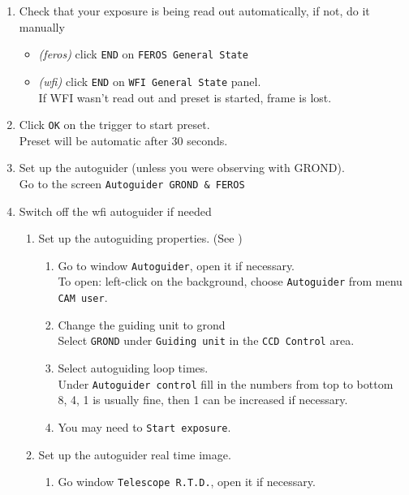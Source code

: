 \documentclass[11pt,fleqn,a4paper]{book}
\begin{document}
\begin{enumerate}
  \item Check that your exposure is being read out automatically, if not, do it manually
    \begin{itemize}
        \item \textit{(\gls{feros})} click \texttt{END} on \texttt{FEROS \gls{General State}}
        \item \textit{(\gls{wfi})} click \texttt{END} on \texttt{WFI \gls{General State}} panel.\\
        If WFI wasn't read out and \gls{preset} is started, frame is lost.
    \end{itemize}
  \item Click \texttt{OK} on the trigger to start \gls{preset}.\\
        Preset will be automatic after 30 seconds.
  \item Set up the autoguider (unless you were observing with GROND).\\
        Go to the screen \texttt{Autoguider GROND \& FEROS}
  \item Switch off the \gls{wfi} autoguider if needed
  \begin{enumerate}
    \item Set up the autoguiding properties. (See )
    \begin{enumerate}
      \item Go to window \texttt{Autoguider}, open it if necessary.\\
            To open: left-click on the background, choose \texttt{Autoguider} from menu \texttt{CAM user}.
      \item Change the guiding unit to \gls{grond}\\
            Select \texttt{GROND} under \texttt{Guiding unit} in the \texttt{CCD Control} area. 
      \item Select autoguiding loop times.\\
        Under \texttt{Autoguider control} fill in the numbers from top to bottom\\8, 4, 1 is usually fine, then 1 can be increased if necessary.
      \item You may need to \texttt{Start exposure}.
    \end{enumerate}
    \item Set up the autoguider real time image.
      \begin{enumerate}
      \item Go window \texttt{Telescope R.T.D.}, open it if necessary.\\

\end{enumerate}
\end{enumerate}
\end{enumerate}
\end{document}
